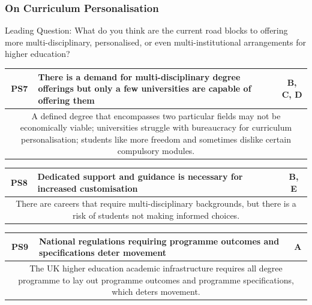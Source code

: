 \subsubsection{On Curriculum Personalisation}

Leading Question: What do you think are the current road blocks to offering more multi-disciplinary,
personalised, or even multi-institutional arrangements for higher education?

\begin{table}[!ht]
	\begin{tabularx}{\textwidth}{|c|X|c|}
		\hline
		PS7                                        & \textbf{There is a demand for multi-disciplinary degree offerings but only a few
		universities are capable of offering them} & B, C, D                                                                          \\
		\hline
		\multicolumn{3}{|X|}{A defined degree that encompasses two particular fields may not be economically viable;
			universities struggle with bureaucracy for curriculum personalisation;
			students like more freedom and sometimes dislike certain compulsory modules.}                                                 \\
		\hline
	\end{tabularx}
\end{table}
\begin{table}[!ht]
	\begin{tabularx}{\textwidth}{|c|X|c|}
		\hline
		PS8 & \textbf{Dedicated support and guidance is necessary for increased customisation} & B, E \\
		\hline
		\multicolumn{3}{|X|}{There are careers that require multi-disciplinary backgrounds, but there is a risk of
			students not making informed choices.}                                                        \\
		\hline
	\end{tabularx}
\end{table}
\begin{table}[!ht]
	\begin{tabularx}{\textwidth}{|c|X|c|}
		\hline
		PS9 & \textbf{National regulations requiring programme outcomes and specifications deter movement} & A \\
		\hline
		\multicolumn{3}{|X|}{The UK higher education academic infrastructure requires all degree programme to lay out
			programme outcomes and programme specifications, which deters movement.}                               \\
		\hline
	\end{tabularx}
\end{table}
